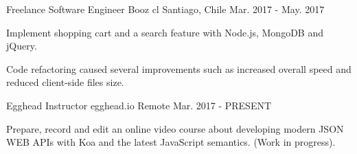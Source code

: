 \begin{cventries}
    
  \cventry
    {Freelance Software Engineer}
    {Booz cl}
    {Santiago, Chile}
    {Mar. 2017 - May. 2017}
    {
      \begin{cvitems}
        \item {Implement shopping cart and a search feature with Node.js, MongoDB and jQuery.}
        \item {Code refactoring caused several improvements such as increased overall speed and reduced client-side files size.}
      \end{cvitems}
    }
    
  \cventry
    {Egghead Instructor}
    {egghead.io}
    {Remote}
    {Mar. 2017 - PRESENT}
    {
      \begin{cvitems}
        \item {Prepare, record and edit an online video course about developing modern JSON WEB APIs with Koa and the latest JavaScript semantics. (Work in progress).}
      \end{cvitems}
    }
    

\end{cventries}
